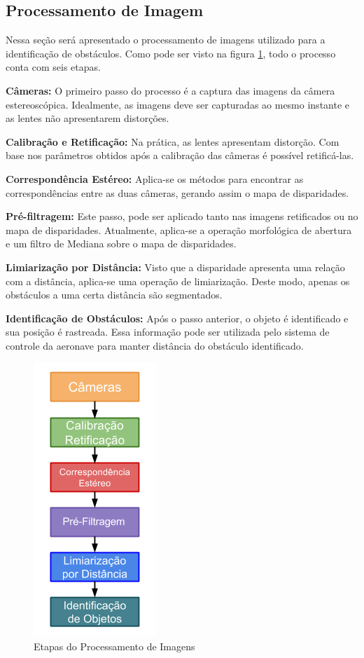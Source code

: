 \subsection{Processamento de Imagem}

Nessa seção será apresentado o processamento de imagens utilizado para a identificação de obstáculos. Como pode ser visto na figura \ref{stereo_processor_steps}, todo o processo conta com seis etapas.

\textbf{Câmeras:} O primeiro passo do processo é a captura das imagens da câmera estereoscópica. Idealmente, as imagens deve ser capturadas ao mesmo instante e as lentes não apresentarem distorções.   

\textbf{Calibração e Retificação:} Na prática, as lentes apresentam distorção. Com base nos parâmetros obtidos após a calibração das câmeras é possível retificá-las. 

\textbf{Correspondência Estéreo:} Aplica-se os métodos para encontrar as correspondências entre as duas câmeras, gerando assim o mapa de disparidades.

\textbf{Pré-filtragem:} Este passo, pode ser aplicado tanto nas imagens retificados ou no mapa de disparidades. Atualmente, aplica-se a operação morfológica de abertura e um filtro de Mediana sobre o mapa de disparidades. 

\textbf{Limiarização por Distância:} Visto que a disparidade apresenta uma relação com a distância, aplica-se uma operação de limiarização. Deste modo, apenas os obstáculos a uma certa distância são segmentados.

\textbf{Identificação de Obstáculos:} Após o passo anterior, o objeto é identificado e sua posição é rastreada. Essa informação pode ser utilizada pelo sistema de controle da aeronave para manter distância do obstáculo identificado.

\begin{figure}[H]
 	\centering
 	\includegraphics[scale=0.50]{./Resources/stereo_processor_steps.png}
 	\caption{Etapas do Processamento de Imagens}
 	\label{stereo_processor_steps}
\end{figure}


